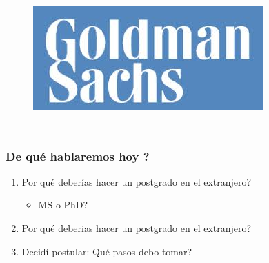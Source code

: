 \documentclass[10pt]{beamer}
\begin{document}
\begin{frame}
\begin{columns}[t]
\begin{figure}[h]
	          \label{fig:MicrosoftLogo}
	          \includegraphics[scale=0.15]{figures/Goldman_Logo.jpg} 	
	          \label{fig:GoldmanLogo}
            \label{fig:Universidades}
	\end{figure} 
\end{columns}

\end{frame}

\begin{frame}
\frametitle{De qué hablaremos hoy ?}
\begin{enumerate}
\item{Por qué deberías hacer un postgrado en el extranjero?
	\begin{itemize}
		\item{MS o PhD?}
	\end{itemize}
}
\item{Por qué {\color{magenta}{NO}} deberias hacer un postgrado en el extranjero?}
\item{ Decidí postular: Qué pasos debo tomar?}
\end{enumerate}

\end{frame}
\end{document}
